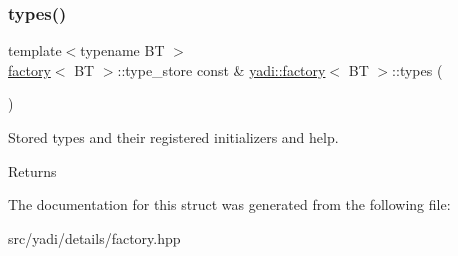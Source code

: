 \subsubsection{\texorpdfstring{types()}{types()}}
{\footnotesize\ttfamily template$<$typename BT $>$ \\
\hyperlink{structyadi_1_1factory}{factory}$<$ BT $>$\+::type\+\_\+store const  \& \hyperlink{structyadi_1_1factory}{yadi\+::factory}$<$ BT $>$\+::types (\begin{DoxyParamCaption}{ }\end{DoxyParamCaption})\hspace{0.3cm}{\ttfamily [static]}}



Stored types and their registered initializers and help. 

\begin{DoxyReturn}{Returns}

\end{DoxyReturn}


The documentation for this struct was generated from the following file\+:\begin{DoxyCompactItemize}
\item 
src/yadi/details/factory.\+hpp\end{DoxyCompactItemize}
